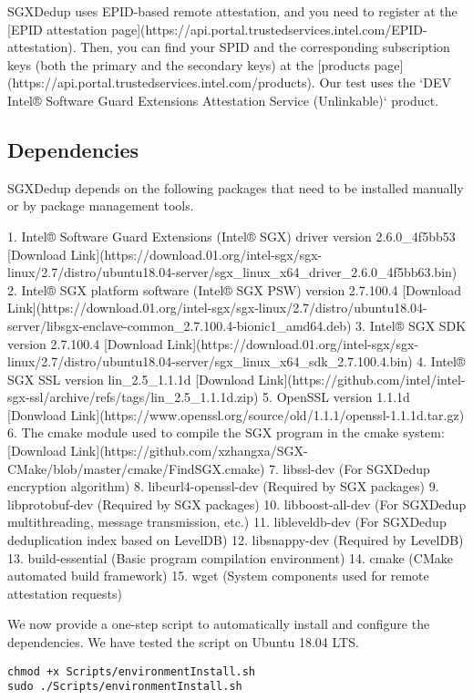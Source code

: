 SGXDedup uses EPID-based remote attestation, and you need to register at the [EPID attestation page](https://api.portal.trustedservices.intel.com/EPID-attestation). Then, you can find your SPID and the corresponding subscription keys (both the primary and the secondary keys) at the [products page](https://api.portal.trustedservices.intel.com/products). Our test uses the `DEV Intel® Software Guard Extensions Attestation Service (Unlinkable)` product.


\subsection{Dependencies}

SGXDedup depends on the following packages that  need to be installed manually or by package management tools.

1. Intel® Software Guard Extensions (Intel® SGX) driver version 2.6.0\_4f5bb53 [Download Link](https://download.01.org/intel-sgx/sgx-linux/2.7/distro/ubuntu18.04-server/sgx\_linux\_x64\_driver\_2.6.0\_4f5bb63.bin)
2. Intel® SGX platform software (Intel® SGX PSW) version 2.7.100.4 [Download Link](https://download.01.org/intel-sgx/sgx-linux/2.7/distro/ubuntu18.04-server/libsgx-enclave-common\_2.7.100.4-bionic1\_amd64.deb)
3. Intel® SGX SDK version 2.7.100.4 [Download Link](https://download.01.org/intel-sgx/sgx-linux/2.7/distro/ubuntu18.04-server/sgx\_linux\_x64\_sdk\_2.7.100.4.bin)
4. Intel® SGX SSL version lin\_2.5\_1.1.1d [Download Link](https://github.com/intel/intel-sgx-ssl/archive/refs/tags/lin\_2.5\_1.1.1d.zip)
5. OpenSSL version 1.1.1d [Donwload Link](https://www.openssl.org/source/old/1.1.1/openssl-1.1.1d.tar.gz)
6. The cmake module used to compile the SGX program in the cmake system: [Download Link](https://github.com/xzhangxa/SGX-CMake/blob/master/cmake/FindSGX.cmake)
7. libssl-dev (For SGXDedup encryption algorithm)
8. libcurl4-openssl-dev (Required by SGX packages)
9. libprotobuf-dev (Required by SGX packages)
10. libboost-all-dev (For SGXDedup multithreading, message transmission, etc.)
11. libleveldb-dev (For SGXDedup deduplication index based on LevelDB)
12. libsnappy-dev (Required by LevelDB)
13. build-essential (Basic program compilation environment)
14. cmake (CMake automated build framework)
15. wget (System components used for remote attestation requests)

We now provide a one-step script to automatically install and configure the dependencies. We have tested the script on Ubuntu 18.04 LTS.

\begin{lstlisting}[style=shell, caption={Bash环境下运行一键配置脚本}, label={lst:sgxdedup-bash-env-install}]
chmod +x Scripts/environmentInstall.sh
sudo ./Scripts/environmentInstall.sh
\end{lstlisting}

